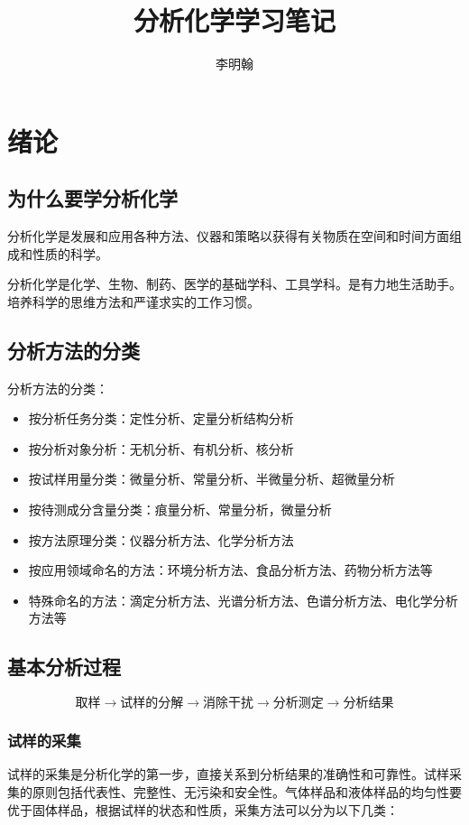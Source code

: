 \documentclass[12pt,a4paper]{article}
\title{分析化学学习笔记}
\author{李明翰}
\numberwithin{equation}{section}
\begin{document}
\maketitle
\newpage
\section{绪论}
\subsection{为什么要学分析化学}
分析化学是发展和应用各种方法、仪器和策略以获得有关物质在空间和时间方面组成和性质的科学。

分析化学是化学、生物、制药、医学的基础学科、工具学科。是有力地生活助手。培养科学的思维方法和严谨求实的工作习惯。
\subsection{分析方法的分类}
分析方法的分类：
\begin{itemize}
\item 按分析任务分类：定性分析、定量分析结构分析
\item 按分析对象分析：无机分析、有机分析、核分析
\item 按试样用量分类：微量分析、常量分析、半微量分析、超微量分析
\item 按待测成分含量分类：痕量分析、常量分析，微量分析
\item 按方法原理分类：仪器分析方法、化学分析方法
\item 按应用领域命名的方法：环境分析方法、食品分析方法、药物分析方法等
\item 特殊命名的方法：滴定分析方法、光谱分析方法、色谱分析方法、电化学分析方法等
\end{itemize}
\subsection{基本分析过程}
\begin{equation}{\text{取样}}\rightarrow{\text{试样的分解}}\rightarrow{\text{消除干扰}}\rightarrow{\text{分析测定}}\rightarrow{\text{分析结果}}\end{equation}
\subsubsection{试样的采集}
试样的采集是分析化学的第一步，直接关系到分析结果的准确性和可靠性。试样采集的原则包括代表性、完整性、无污染和安全性。气体样品和液体样品的均匀性要优于固体样品，根据试样的状态和性质，采集方法可以分为以下几类：
\end{document}
